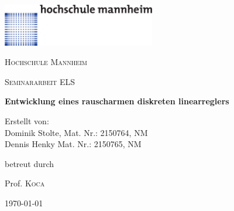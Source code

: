 \begin{titlepage}

  \includegraphics[width=0.5\textwidth]{../common/hsma-logo.pdf}\par\vspace{1cm}
  \centering
	{\scshape\LARGE Hochschule Mannheim \par}
	\vspace{1cm}
	{\scshape\Large Seminararbeit ELS\par}
	\vspace{1.5cm}
	{\huge\bfseries Entwicklung eines rauscharmen diskreten linearreglers\par}
	\vspace{2cm}
	{\Large Erstellt von:\\
	Dominik Stolte, Mat. Nr.: 2150764, NM\\ 
	Dennis Henky Mat. Nr.: 2150765, NM\par}
	\vfill
	betreut durch\par
	Prof. \textsc{Koca}
	\vfill
	{\large \today\par}
\end{titlepage}